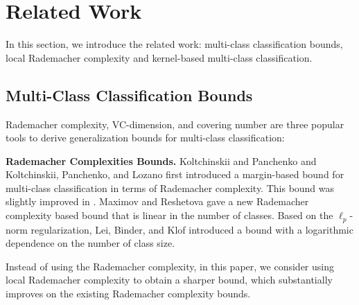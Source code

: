 \documentclass{article}
\begin{document}

\section{Related Work}
In this section,
we  introduce  the related work:
multi-class classification bounds,
local Rademacher complexity and kernel-based multi-class classification.

\subsection{Multi-Class Classification Bounds}
 Rademacher complexity, VC-dimension, and covering number are  three
 popular tools to derive generalization bounds for multi-class classification:

\textbf{Rademacher Complexities Bounds.}
   Koltchinskii and Panchenko 
    and Koltchinskii, Panchenko, and Lozano 
    first introduced a margin-based bound for multi-class classification in terms of Rademacher complexity.
    This bound was slightly improved in \cite{mohri2012foundations,cortes2013multi}.
    Maximov and Reshetova \cite{maximov2016tight} gave a new Rademacher complexity based bound
    that is linear in the number of classes.
    Based on the $\ell_p$-norm regularization,
    Lei, Binder, and Klof  introduced a bound
    with a logarithmic dependence on the number of class size.

    Instead of using the Rademacher complexity,
    in this paper, we consider using local Rademacher complexity
    to obtain a sharper bound, which  substantially improves on
    the existing Rademacher complexity bounds.
\end{document}
